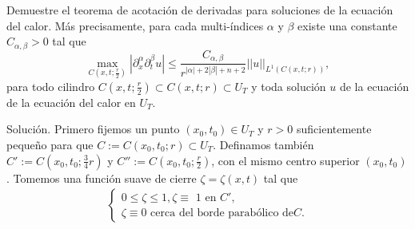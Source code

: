 \begin{homeworkProblem}
  Demuestre el teorema de acotación de derivadas para soluciones de la ecuación del calor. Más precisamente, para cada multi-índices $\alpha$ y $\beta$ existe una constante $C_{\alpha, \beta} > 0$ tal que
  \begin{equation*}
    \max_{C(x, t; \frac{r}{2})} |\partial_{x}^{\alpha} \partial_{t}^{\beta}u| \leq \dfrac{C_{\alpha, \beta}}{r^{|\alpha|+2|\beta|+n+2}}||u||_{L^{1}(C(x,t;r))}, 
  \end{equation*}
  para todo cilindro $C(x,t;\frac{r}{2}) \subset C(x,t;r) \subset U_{T}$ y toda solución $u$ de la ecuación de la ecuación del calor en $U_{T}$.
  \begin{solucion}
    Solución. Primero fijemos un punto $(x_{0}, t_{0}) \in U_{T}$ y $r>0$ suficientemente pequeño para que $C:=C(x_{0}, t_{0};r) \subset U_{T}$. Definamos también $C':=C(x_{0}, t_{0};\frac{3}{4}r)$ y $C'':=C(x_{0}, t_{0};\frac{r}{2})$, con el mismo centro superior $(x_{0}, t_{0})$.
    Tomemos una función suave de cierre $\zeta = \zeta(x,t)$ tal que\
    \begin{align*}
      \begin{cases*}
        0 \leq \zeta \leq 1, \zeta \equiv \text{ 1 en } C',\\
        \zeta \equiv 0 \text{ cerca del borde parabólico de} C.
      \end{cases*}  
    \end{align*}
    

\end{solucion}
\end{homeworkProblem}
